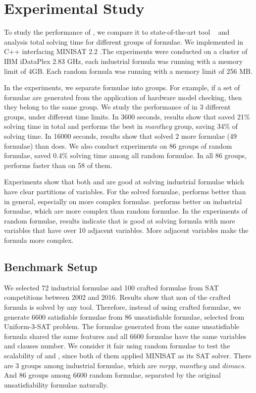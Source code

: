 \section{Experimental Study}\label{sec:expr}
To study the performance of \tool, we compare it to state-of-the-art tool \minibones~\cite{JLM15} and analysis total solving time for different groups of formulae.
We implemented \tool in C++ interfacing MINISAT 2.2 \cite{MINISAT}.The experiments were conducted on a cluster of IBM iDataPlex 2.83 GHz, each industrial formula was running with a memory limit of 4GB. Each random formula was running with a memory limit of 256 MB.

In the experiments, we separate formulae into groups. For example, if a set of formulae are generated from the application of hardware model checking, then they belong to the same group. We study the performance of \tool in 3 different groups, under different time limits. In 3600 seconds, results show that \tool saved 21\% solving time in total and performs the best in $\textit{manthey}$ group, saving 34\% of solving time. In 16000 seconds, results show that \tool solved 2 more formulae (49 formulae) than \minibones does.
We also conduct experiments on 86 groups of random formulae, \tool saved 0.4\% solving time among all random formulae. In all 86 groups, \tool performs faster than \minibones on 58 of them.

Experiments show that both \tool and \minibones are good at solving industrial formulae which have clear partitions of variables. For the solved formulae, \tool performs better than \minibones in general, especially on more complex formulae. \tool performs better on industrial formulae, which are more complex than random formulae. In the experiments of random formulae, results indicate that \tool is good at solving formula with more variables that have over 10 adjacent variables. More adjacent variables make the formula more complex. 
\subsection{Benchmark Setup}

We selected 72 industrial formulae and 100 crafted formulae from SAT competitions between 2002 and 2016. Results show that non of the crafted formula is solved by any tool. Therefore, instead of using crafted formulae, we generate 6600 satisfiable formulae from 86 unsatisfiable formulae, selected from Uniform-3-SAT problem. The formulae generated from the same unsatisfiable formula shared the same features and all 6600 formulae have the same variables and clauses number. We consider it fair using random formulae to test the scalability of \tool and \minibones, since both of them applied MINISAT as its SAT solver.
There are 3 groups among industrial formulae, which are $\textit{mrpp}$, $\textit{manthey}$ and $\textit{dimacs}$. And 86 groups among 6600 random formulae, separated by the original unsatisfiability formulae naturally.

